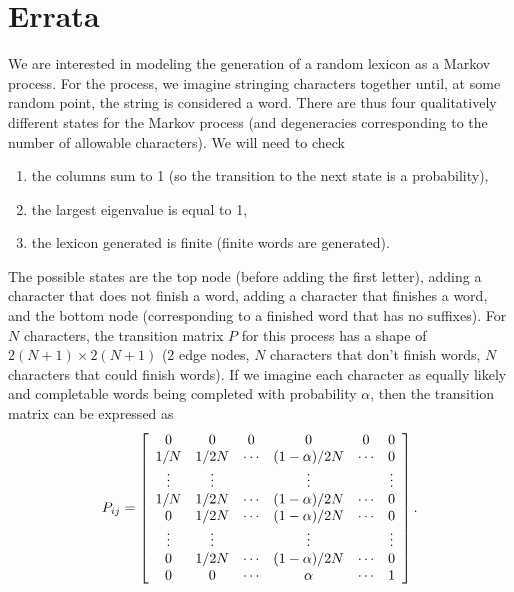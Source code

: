 \documentclass[11pt]{article}
\begin{document}
\section{Errata}
We are interested in modeling the generation of a random lexicon as a Markov process. For the process, we imagine stringing characters together until, at some random point, the string is considered a word. There are thus four qualitatively different states for the Markov process (and degeneracies corresponding to the number of allowable characters). We will need to check
\begin{enumerate}
\item the columns sum to 1 (so the transition to the next state is a probability),
\item the largest eigenvalue is equal to 1,
\item the lexicon generated is finite (finite words are generated).
\end{enumerate}
The possible states are the top node (before adding the first letter), adding a character that does not finish a word, adding a character that finishes a word, and the bottom node (corresponding to a finished word that has no suffixes). For $N$ characters, the transition matrix $P$ for this process has a shape of $2(N+1)\times2(N+1)$ (2 edge nodes, $N$ characters that don't finish words, $N$ characters that could finish words). If we imagine each character as equally likely and completable words being completed with probability $\alpha$, then the transition matrix can be expressed as
\begin{equation}
P_{ij}=\left[\begin{array}{c c c c c c}
0 & 0 & 0 & 0 & 0 & 0 \\
1/N & 1/2N&\cdots & (1-\alpha)/2N & \cdots & 0\\
\vdots & \vdots & & \vdots & & \vdots\\
1/N & 1/2N & \cdots & (1-\alpha)/2N & \cdots & 0\\
0 & 1/2N & \cdots & (1-\alpha)/2N & \cdots & 0\\
\vdots & \vdots & & \vdots & & \vdots\\
0 & 1/2N & \cdots & (1-\alpha)/2N & \cdots & 0\\
0 & 0 & \cdots & \alpha & \cdots & 1
\end{array}
\right].
\end{equation}
\end{document}
